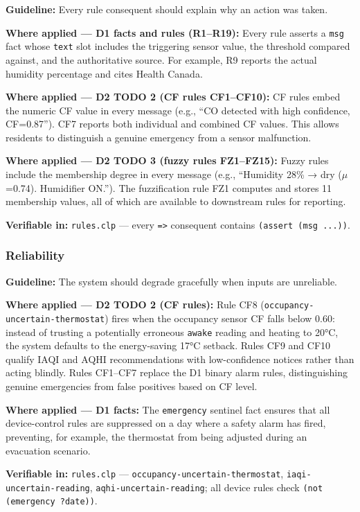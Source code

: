 \documentclass{article}
\begin{document}
\textbf{Guideline:} Every rule consequent should explain why an action was taken.

\textbf{Where applied — D1 facts and rules (R1–R19):} Every rule asserts a \texttt{msg} fact whose \texttt{text} slot includes the triggering sensor value, the threshold compared against, and the authoritative source. For example, R9 reports the actual humidity percentage and cites Health Canada.

\textbf{Where applied — D2 TODO 2 (CF rules CF1–CF10):} CF rules embed the numeric CF value in every message (e.g., ``CO detected with high confidence, CF=0.87''). CF7 reports both individual and combined CF values. This allows residents to distinguish a genuine emergency from a sensor malfunction.

\textbf{Where applied — D2 TODO 3 (fuzzy rules FZ1–FZ15):} Fuzzy rules include the membership degree in every message (e.g., ``Humidity 28\% → dry ($\mu$=0.74). Humidifier ON.''). The fuzzification rule FZ1 computes and stores 11 membership values, all of which are available to downstream rules for reporting.

\textbf{Verifiable in:} \texttt{rules.clp} — every \texttt{=>} consequent contains \texttt{(assert (msg ...))}.

\subsubsection{Reliability}

\textbf{Guideline:} The system should degrade gracefully when inputs are unreliable.

\textbf{Where applied — D2 TODO 2 (CF rules):} Rule CF8 (\texttt{occupancy-uncertain-thermostat}) fires when the occupancy sensor CF falls below 0.60: instead of trusting a potentially erroneous \texttt{awake} reading and heating to 20°C, the system defaults to the energy-saving 17°C setback. Rules CF9 and CF10 qualify IAQI and AQHI recommendations with low-confidence notices rather than acting blindly. Rules CF1–CF7 replace the D1 binary alarm rules, distinguishing genuine emergencies from false positives based on CF level.

\textbf{Where applied — D1 facts:} The \texttt{emergency} sentinel fact ensures that all device-control rules are suppressed on a day where a safety alarm has fired, preventing, for example, the thermostat from being adjusted during an evacuation scenario.

\textbf{Verifiable in:} \texttt{rules.clp} — \texttt{occupancy-uncertain-thermostat}, \texttt{iaqi-uncertain-reading}, \texttt{aqhi-uncertain-reading}; all device rules check \texttt{(not (emergency ?date))}.
\end{document}
